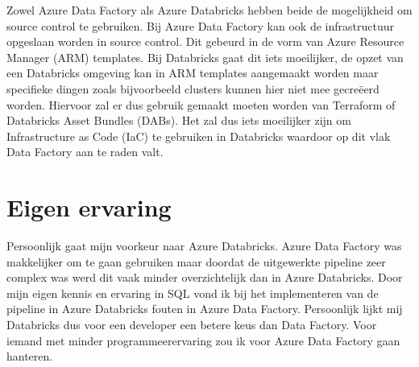 
Zowel Azure Data Factory als Azure Databricks hebben beide de mogelijkheid om source control te gebruiken. Bij Azure Data Factory kan ook de infrastructuur opgeslaan worden in source control. Dit gebeurd in de vorm van Azure Resource Manager (ARM) templates. Bij Databricks gaat dit iets moeilijker, de opzet van een Databricks omgeving kan in ARM templates aangemaakt worden maar specifieke dingen zoals bijvoorbeeld clusters kunnen hier niet mee gecreëerd worden. Hiervoor zal er dus gebruik gemaakt moeten worden van Terraform of Databricks Asset Bundles (DABs). Het zal dus iets moeilijker zijn om Infrastructure as Code (IaC) te gebruiken in Databricks waardoor op dit vlak Data Factory aan te raden valt.

\section{Eigen ervaring}

Persoonlijk gaat mijn voorkeur naar Azure Databricks. Azure Data Factory was makkelijker om te gaan gebruiken maar doordat de uitgewerkte pipeline zeer complex was werd dit vaak minder overzichtelijk dan in Azure Databricks. Door mijn eigen kennis en ervaring in SQL vond ik bij het implementeren van de pipeline in Azure Databricks fouten in Azure Data Factory. Persoonlijk lijkt mij Databricks dus voor een developer een betere keus dan Data Factory. Voor iemand met minder programmeerervaring zou ik voor Azure Data Factory gaan hanteren.